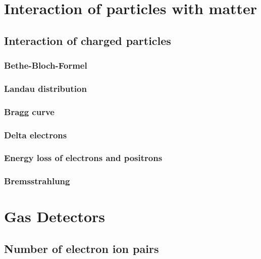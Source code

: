 \documentclass{article}
\begin{document}
\section{Interaction of particles with matter}
\graphicspath{{bilder/1-1/}}
	\subsection{Interaction of charged particles}
		
			\subsubsection{Bethe-Bloch-Formel}
				
			\subsubsection{Landau distribution}
				
			\subsubsection{Bragg curve}
				
			\subsubsection{Delta electrons}
				
			\subsubsection{Energy loss of electrons and positrons}
				
			\subsubsection{Bremsstrahlung}
				

\section{Gas Detectors}
\graphicspath{{bilder/3-1/}}
 
	\subsection{Number of electron ion pairs}
		
\end{document}
